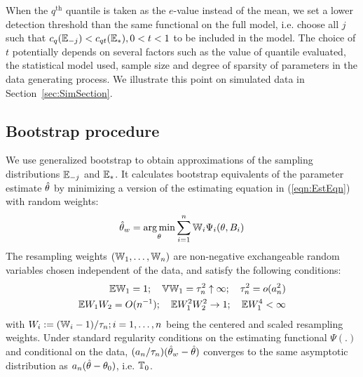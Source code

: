 When the $q^\text{th}$ quantile is taken as the $e$-value instead of the mean, we set a lower detection threshold than the same functional on the full model, i.e. choose all $j$ such that $c_q (\mathbb{E}_{-j}) < c_{q t} (\mathbb{E}_{*}), 0 < t < 1$ to be included in the model. The choice of $t$ potentially depends on several factors such as the value of quantile evaluated, the statistical model used, sample size and degree of sparsity of parameters in the data generating process. We illustrate this point on simulated data in Section~\ref{sec:SimSection}.

\subsection{Bootstrap procedure}
\label{subsec:BootEvalue}
We use generalized bootstrap \citep{ChatterjeeBose05} to obtain approximations of the sampling distributions $\mathbb{E}_{-j}$ and $\mathbb{E}_*$. It calculates bootstrap equivalents of the parameter estimate $\hat {{\theta}}$ by minimizing a version of the estimating equation in (\ref{eqn:EstEqn}) with random weights:
%
\begin{align}
\hat {{\theta}}_w = \operatorname*{arg\,min}_{ {\theta}} \sum_{i=1}^n \mathbb{W}_{i} \Psi_i  ( {\theta}, B_i)
\end{align}
%
The resampling weights $(\mathbb{W}_{1}, \ldots, \mathbb{W}_{n})$ are non-negative exchangeable random variables chosen independent of the data, and satisfy the following conditions:
%
\begin{eqnarray}
\mathbb{E} \mathbb{W}_1  = 1; \quad
\mathbb{V} \mathbb{W}_1  = \tau_{n}^{2} \uparrow \infty; \quad
\tau_n^{2} 
= o ( a_n^{2})\label{eq:ResamplingweightBW}\\
\mathbb{E} W_{1} W_{2} = O (n^{-1}); \quad
\mathbb{E} W_{1}^{2} W_{2}^{2} \rightarrow 1; \quad
\mathbb{E} W_{1}^{4} < \infty \label{eq:ResamplingweightW}
\end{eqnarray}
%
with $W_i := (\mathbb{W}_i - 1)/ \tau_n; i = 1, \ldots, n$ being the centered and scaled resampling weights. Under standard regularity conditions on the estimating functional $\Psi(.)$ \citep{ChatterjeeBose05, MajumdarChatterjee17} and conditional on the data, $(a_n/\tau_n) (\hat {{\theta}}_w - \hat {{\theta}})$ converges to the same asymptotic distribution as $a_n ( \hat {{\theta}} - {\theta}_0 )$, i.e. $\mathbb{T}_0$.


